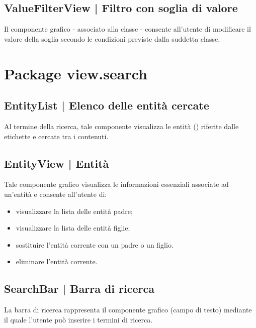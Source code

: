 \documentclass[10pt,a4paper,headinclude,footinclude,hidelinks]{scrreprt} %
\begin{document}
	\subsection[ValueFilterView]{ValueFilterView | Filtro con soglia di valore}
	\label{sec:stage:design:sistema:view.filter:value-filter}
	Il componente grafico - associato alla classe \textit{} - consente all'utente di modificare il valore della soglia secondo le condizioni previste dalla suddetta classe.

	\section{Package view.search}
	\label{sec:stage:design:sistema:view.search}

	\subsection[EntityList]{EntityList | Elenco delle entità cercate}
	\label{sec:stage:design:sistema:view.search:search-entity-list}
	Al termine della ricerca, tale componente visualizza le entità (\textit{}) riferite dalle etichette e cercate tra i contenuti.

	\subsection[EntityView]{EntityView | Entità}
	\label{sec:stage:design:sistema:view.search:entity}
	Tale componente grafico visualizza le informazioni essenziali associate ad un'entità e consente all'utente di:
	\begin{itemize}
	\item visualizzare la lista delle entità padre;
	\item visualizzare la lista delle entità figlie;
	\item sostituire l'entità corrente con un padre o un figlio.
	\item eliminare l'entità corrente.
	\end{itemize}

	\subsection[SearchBar]{SearchBar | Barra di ricerca}
	\label{sec:stage:design:sistema:view.search:search-bar}
	La barra di ricerca rappresenta il componente grafico (campo di testo) mediante il quale l'utente può inserire i termini di ricerca.
\end{document}
